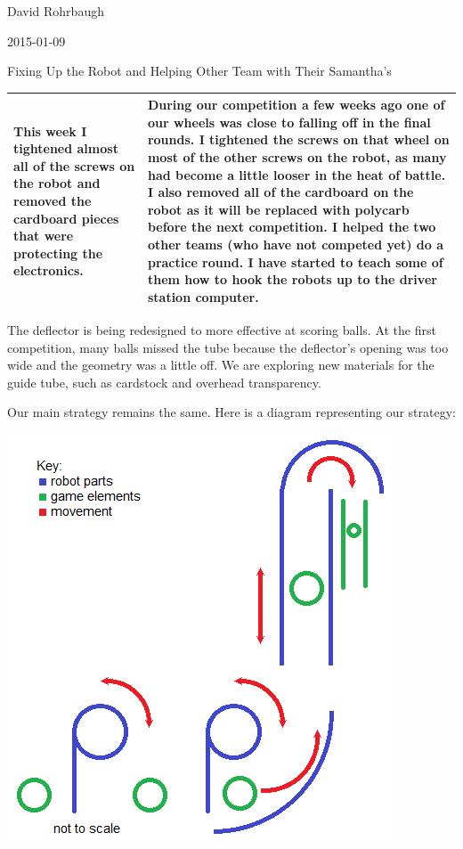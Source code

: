 David Rohrbaugh

2015-01-09

Fixing Up the Robot and Helping Other Team with Their Samantha's

\begin{tabular}{|p{5cm}|p{5cm}|}
 \hline
 This week I tightened almost all of the screws on the robot and removed the cardboard pieces that were protecting the electronics.
 &
 During our competition a few weeks ago one of our wheels was close to falling off in the final rounds. I tightened the screws on that wheel on most of the other screws on the robot, as many had become a little looser in the heat of battle. I also removed all of the cardboard on the robot as it will be replaced with polycarb before the next competition. I helped the two other teams (who have not competed yet) do a practice round. I have started to teach some of them how to hook the robots up to the driver station computer.
 \\
 \hline
\end{tabular}

\medskip

The deflector is being redesigned to more effective at scoring balls. At the first competition, many balls missed the tube because the deflector's opening was too wide and the geometry was a little off. We are exploring new materials for the guide tube, such as cardstock and overhead transparency.

\medskip

Our main strategy remains the same. Here is a diagram representing our strategy:

\begin{center}
 \includegraphics[scale=0.7]{./Entries/Images/scoring_design.png}
\end{center}
